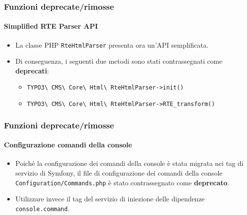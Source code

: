 
\begin{frame}[fragile]
	\frametitle{Funzioni deprecate/rimosse}
	\framesubtitle{Simplified RTE Parser API}

	\begin{itemize}
		\item La classe PHP \texttt{RteHtmlParser} presenta ora un'API semplificata.
		\item Di conseguenza, i seguenti due metodi sono stati contrassegnati come \textbf{deprecati}:

			\begin{itemize}
				\item \texttt{TYPO3\textbackslash
					CMS\textbackslash
					Core\textbackslash
					Html\textbackslash
					RteHtmlParser->init()}
				\item \texttt{TYPO3\textbackslash
					CMS\textbackslash
					Core\textbackslash
					Html\textbackslash
					RteHtmlParser->RTE\_transform()}
			\end{itemize}

	\end{itemize}

\end{frame}


\begin{frame}[fragile]
	\frametitle{Funzioni deprecate/rimosse}
	\framesubtitle{Configurazione comandi della console}

	\begin{itemize}
		\item Poiché la configurazione dei comandi della console è stata migrata nei tag di servizio di Symfony,
			il file di configurazione dei comandi della console  \texttt{Configuration/Commands.php}
			è stato contrassegnato come \textbf{deprecato}.
		\item Utilizzare invece il tag del servizio di iniezione delle dipendenze \texttt{console.command}.

	\end{itemize}

\end{frame}


